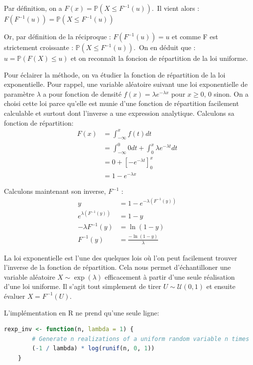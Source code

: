 \documentclass[10pt]{article} %
\begin{document}
Par définition, on a $F(x) = \mathbb{P}(X \leq  F^{-1}(u) )$.\
Il vient alors :
$F(F^{-1}(u)) = \mathbb{P}(X \leq F^{-1}(u) )$

Or, par définition de la réciproque :
$F(F^{-1}(u)) = u$ et comme F est strictement croissante : $\mathbb{P}(X \leq F^{-1}(u) )$.\
On en déduit que : $u = \mathbb{P}(F(X) \leq u )$ et on reconnaît la foncion de répartition de la loi uniforme.

Pour éclairer la méthode, on va étudier la fonction de répartition de la loi exponentielle. Pour rappel, une variable aléatoire suivant une loi exponentielle de paramètre
$\lambda$ a pour fonction de densité $f(x) = \lambda e^{-\lambda x}$ pour $x \geq 0$, $0$ sinon. On a choisi cette loi parce qu'elle est munie d'une fonction de répartition facilement calculable
et surtout dont l'inverse a une expression analytique. Calculons sa fonction de répartition:
\begin{align*}
    F(x) &= \int_{-\infty}^xf(t)dt \\
    & = \int_{-\infty}^0 0 dt + \int_0^x \lambda e^{-\lambda t} dt \\
    &= 0 + \left[-e^{-\lambda t}\right]_0^x \\
    &= 1 - e^{-\lambda x}
\end{align*}

Calculons maintenant son inverse, $F^{-1}$ :
\begin{align*}
    y &= 1 - e^{-\lambda (F^{-1}(y))} \\
    e^{\lambda (F^{-1}(y))} &= 1 - y \\
    -\lambda F^{-1}(y) &= \ln(1 - y) \\
    F^{-1}(y) &= \frac{-\ln(1 - y)}{\lambda}
\end{align*}

La loi exponentielle est l'une des quelques lois où l'on peut facilement trouver l'inverse de la fonction de répartition. Cela nous permet
d'échantilloner une variable aléatoire $X \sim \exp(\lambda)$ efficacement à partir d'une seule réalisation d'une loi uniforme. Il s'agit tout
simplement de tirer $U \sim \mathcal{U}(0, 1)$ et ensuite évaluer $X = F^{-1}(U)$.

L'implémentation en R ne prend qu'une seule ligne:

\begin{lstlisting}[language=R]
    rexp_inv <- function(n, lambda = 1) {
        # Generate n realizations of a uniform random variable n times
        (-1 / lambda) * log(runif(n, 0, 1))
    }
\end{lstlisting}
\end{document}
